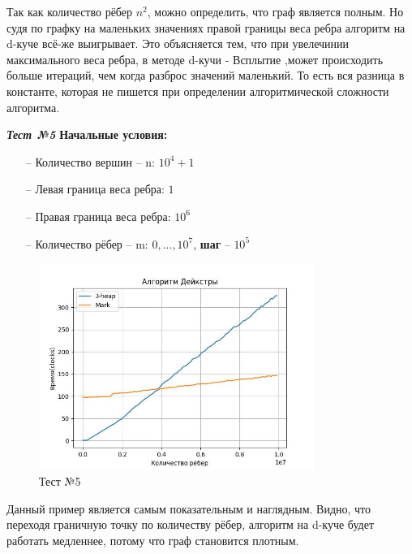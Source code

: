 \begin{text}
Так как количество рёбер $n^2$, можно определить, что граф является полным. Но судя по графку на маленьких значениях правой границы веса ребра алгоритм на d-куче всё-же выигрывает. Это объясняется тем, что при увелечинии максимального веса ребра, в методе d-кучи - \guillemotleft Всплытие \guillemotright ,может происходить больше итераций, чем когда разброс значений маленький. То есть вся разница в константе, которая не пишется при определении алгоритмической сложности алгоритма.\\
\newpage

\begin{center}
\textbf{\textit{Тест №5}}
\textbf{Начальные условия:}

\begin{enumerate}
	\item[--] Количество вершин -- n: $10^4 + 1$
	\item[--] Левая граница веса ребра: $1$
	\item[--] Правая граница веса ребра: $10^6$
	\item[--] Количество рёбер -- m: $0,...,10^7$, \textbf{шаг} -- $10^5$
\end{enumerate}

\end{center}
\begin{figure}[h]
  \centering
  \includegraphics[width=0.8\textwidth]{pictures/5.jpeg}
  \caption{Тест №5}
  \label{fig:pict_5}
\end{figure}

Данный пример является самым показательным и наглядным. Видно, что переходя граничную точку по количеству рёбер, алгоритм на d-куче будет работать медленнее, потому что граф становится плотным.\\
\newpage


\end{text}
